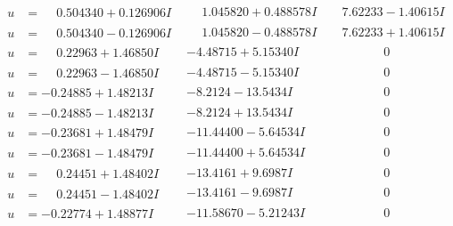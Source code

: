 \documentclass[1p]{elsarticle_modified}
\theoremstyle{definition}
\begin{document}
$$\begin{array}{c|c|c}
\begin{aligned}
u &= \phantom{-}0.504340 + 0.126906 I\end{aligned}
 & \phantom{-}1.045820 + 0.488578 I & \phantom{-}7.62233 - 1.40615 I \\ \hline\begin{aligned}
u &= \phantom{-}0.504340 - 0.126906 I\end{aligned}
 & \phantom{-}1.045820 - 0.488578 I & \phantom{-}7.62233 + 1.40615 I \\ \hline\begin{aligned}
u &= \phantom{-}0.22963 + 1.46850 I\end{aligned}
 & -4.48715 + 5.15340 I & \phantom{-0.000000 } 0 \\ \hline\begin{aligned}
u &= \phantom{-}0.22963 - 1.46850 I\end{aligned}
 & -4.48715 - 5.15340 I & \phantom{-0.000000 } 0 \\ \hline\begin{aligned}
u &= -0.24885 + 1.48213 I\end{aligned}
 & -8.2124 - 13.5434 I & \phantom{-0.000000 } 0 \\ \hline\begin{aligned}
u &= -0.24885 - 1.48213 I\end{aligned}
 & -8.2124 + 13.5434 I & \phantom{-0.000000 } 0 \\ \hline\begin{aligned}
u &= -0.23681 + 1.48479 I\end{aligned}
 & -11.44400 - 5.64534 I & \phantom{-0.000000 } 0 \\ \hline\begin{aligned}
u &= -0.23681 - 1.48479 I\end{aligned}
 & -11.44400 + 5.64534 I & \phantom{-0.000000 } 0 \\ \hline\begin{aligned}
u &= \phantom{-}0.24451 + 1.48402 I\end{aligned}
 & -13.4161 + 9.6987 I & \phantom{-0.000000 } 0 \\ \hline\begin{aligned}
u &= \phantom{-}0.24451 - 1.48402 I\end{aligned}
 & -13.4161 - 9.6987 I & \phantom{-0.000000 } 0 \\ \hline\begin{aligned}
u &= -0.22774 + 1.48877 I\end{aligned}
 & -11.58670 - 5.21243 I & \phantom{-0.000000 } 0 \\ \hline\begin{aligned}

\end{aligned}
\end{array}$$
\end{document}
